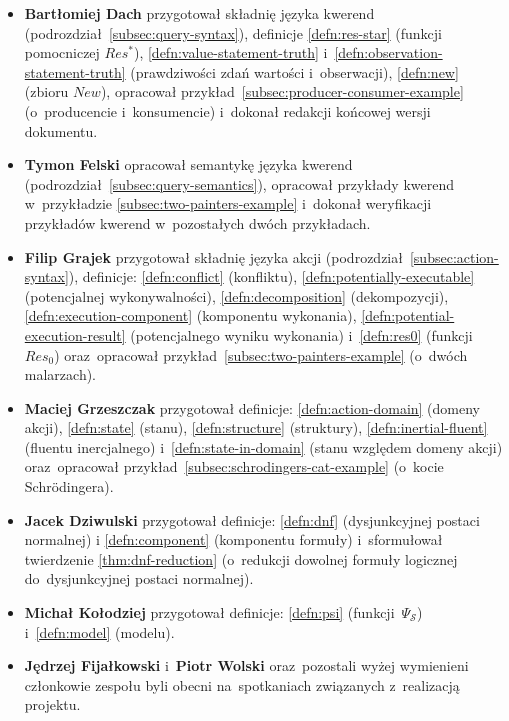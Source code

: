 \documentclass[11pt,a4paper]{article}
\begin{document}
\begin{itemize}
    \item \textbf{Bartłomiej Dach} przygotował składnię języka kwerend (podrozdział~\ref{subsec:query-syntax}), definicje \ref{defn:res-star} (funkcji pomocniczej $Res^*$), \ref{defn:value-statement-truth} i~\ref{defn:observation-statement-truth} (prawdziwości zdań wartości i~obserwacji), \ref{defn:new} (zbioru $New$), opracował przykład~\ref{subsec:producer-consumer-example} (o~producencie i~konsumencie) i~dokonał redakcji końcowej wersji dokumentu.
    \item \textbf{Tymon Felski} opracował semantykę języka kwerend (podrozdział~\ref{subsec:query-semantics}), opracował przykłady kwerend w~przykładzie \ref{subsec:two-painters-example} i~dokonał weryfikacji przykładów kwerend w~pozostałych dwóch przykładach.
    \item \textbf{Filip Grajek} przygotował składnię języka akcji (podrozdział~\ref{subsec:action-syntax}), definicje: \ref{defn:conflict} (konfliktu), \ref{defn:potentially-executable} (potencjalnej wykonywalności), \ref{defn:decomposition} (dekompozycji), \ref{defn:execution-component} (komponentu wykonania), \ref{defn:potential-execution-result} (potencjalnego wyniku wykonania) i~\ref{defn:res0} (funkcji~$Res_0$) oraz~opracował przykład~\ref{subsec:two-painters-example} (o~dwóch malarzach).
    \item \textbf{Maciej Grzeszczak} przygotował definicje: \ref{defn:action-domain} (domeny akcji), \ref{defn:state} (stanu), \ref{defn:structure} (struktury), \ref{defn:inertial-fluent} (fluentu inercjalnego) i~\ref{defn:state-in-domain} (stanu względem domeny akcji) oraz~opracował przykład~\ref{subsec:schrodingers-cat-example} (o~kocie Schr\"{o}dingera).
    \item \textbf{Jacek Dziwulski} przygotował definicje: \ref{defn:dnf} (dysjunkcyjnej postaci normalnej) i \ref{defn:component} (komponentu formuły) i~sformułował twierdzenie \ref{thm:dnf-reduction} (o~redukcji dowolnej formuły logicznej do~dysjunkcyjnej postaci normalnej).
    \item \textbf{Michał Kołodziej} przygotował definicje: \ref{defn:psi} (funkcji~$\Psi_{\mathcal{S}}$) i~\ref{defn:model} (modelu).
    \item \textbf{Jędrzej Fijałkowski} i~\textbf{Piotr Wolski} oraz~pozostali wyżej wymienieni członkowie zespołu byli obecni na~spotkaniach związanych z~realizacją projektu.
\end{itemize}
\end{document}
